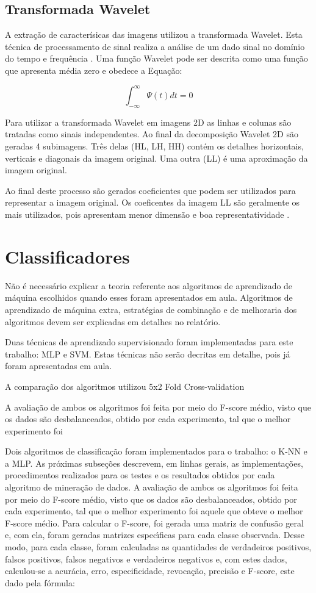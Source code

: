 \documentclass[conference]{IEEEtran}
\begin{document}
\subsection{Transformada Wavelet}
A extração de caracterísicas das imagens utilizou a transformada Wavelet. Esta técnica de processamento de sinal realiza a análise de um dado sinal no domínio do tempo e frequência \cite{costa2011ensemble}. Uma função Wavelet pode ser descrita como uma função que apresenta média zero e obedece a Equação:

\[\int_{-\infty}^{\infty} \Psi(t)dt = 0\]

Para utilizar a transformada Wavelet em imagens 2D as linhas e colunas são tratadas como sinais independentes. Ao final da decomposição Wavelet 2D são geradas 4 subimagens. Três delas (HL, LH, HH) contém os detalhes horizontais, verticais e diagonais da imagem original. Uma outra (LL) é uma aproximação da imagem original.

Ao final deste processo são gerados coeficientes que podem ser utilizados para representar a imagem original. Os coeficentes da imagem LL são geralmente os mais utilizados, pois apresentam menor dimensão e boa representatividade \cite{burrus1997introduction}.

\section{Classificadores}
Não é necessário explicar a teoria referente aos algoritmos de aprendizado de máquina
escolhidos quando esses foram apresentados em aula. Algoritmos de aprendizado de máquina
extra, estratégias de combinação e de melhoraria dos algoritmos devem ser explicadas em
detalhes no relatório.

Duas técnicas de aprendizado supervisionado foram implementadas para este trabalho: MLP e SVM. Estas técnicas não serão decritas em detalhe, pois já foram apresentadas em aula.

A comparação dos algoritmos utilizou 5x2 Fold Cross-validation

 A avaliação de ambos os algoritmos foi feita por meio do
F-score médio, visto que os dados são desbalanceados, obtido
por cada experimento, tal que o melhor experimento foi


Dois algoritmos de classificação foram implementados
para o trabalho: o K-NN e a MLP. As próximas
subseções descrevem, em linhas gerais, as implementações,
procedimentos realizados para os testes e os resultados
obtidos por cada algoritmo de mineração de dados.
A avaliação de ambos os algoritmos foi feita por meio do
F-score médio, visto que os dados são desbalanceados, obtido
por cada experimento, tal que o melhor experimento foi
aquele que obteve o melhor F-score médio.
Para calcular o F-score, foi gerada uma matriz de confusão
geral e, com ela, foram geradas matrizes especı́ficas para
cada classe observada. Desse modo, para cada classe, foram
calculadas as quantidades de verdadeiros positivos, falsos
positivos, falsos negativos e verdadeiros negativos e, com
estes dados, calculou-se a acurácia, erro, especificidade,
revocação, precisão e F-score, este dado pela fórmula:
\end{document}
